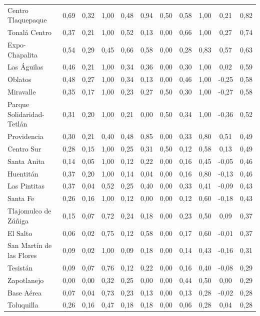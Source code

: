 \documentclass[openany]{book}
\begin{document}
\begin{table}[H]
\begin{tabular}{|l|c|c|c|c|c|c|c|c|c|c|}
			Centro Tlaquepaque & 0,69 & 0,32 & 1,00 & 0,48 & 0,94 & 0,50 & 0,58 & 1,00 & 0,21 & 0,82 \\
			Tonalá Centro & 0,37 & 0,21 & 1,00 & 0,52 & 0,13 & 0,00 & 0,66 & 1,00 & 0,27 & 0,74 \\
			Expo-Chapalita & 0,54 & 0,29 & 0,45 & 0,66 & 0,58 & 0,00 & 0,28 & 0,83 & 0,57 & 0,63 \\
			Las Águilas & 0,46 & 0,21 & 1,00 & 0,34 & 0,36 & 0,00 & 0,30 & 1,00 & 0,02 & 0,59 \\
			Oblatos & 0,48 & 0,27 & 1,00 & 0,34 & 0,13 & 0,00 & 0,46 & 1,00 & -0,25 & 0,58 \\
			Miravalle & 0,35 & 0,17 & 1,00 & 0,23 & 0,27 & 0,50 & 0,30 & 1,00 & -0,27 & 0,58 \\
			Parque Solidaridad-Tetlán & 0,31 & 0,20 & 1,00 & 0,21 & 0,00 & 0,50 & 0,34 & 1,00 & -0,36 & 0,52 \\
			Providencia & 0,30 & 0,21 & 0,40 & 0,48 & 0,85 & 0,00 & 0,33 & 0,80 & 0,51 & 0,49 \\
			Centro Sur & 0,28 & 0,15 & 1,00 & 0,25 & 0,31 & 0,50 & 0,12 & 0,58 & 0,13 & 0,49 \\
			Santa Anita & 0,14 & 0,05 & 1,00 & 0,12 & 0,22 & 0,00 & 0,16 & 0,45 & -0,05 & 0,46 \\
			Huentitán & 0,37 & 0,20 & 1,00 & 0,14 & 0,04 & 0,00 & 0,16 & 0,80 & -0,13 & 0,46 \\
			Las Pintitas & 0,37 & 0,04 & 0,52 & 0,25 & 0,40 & 0,00 & 0,33 & 0,41 & -0,09 & 0,43 \\
			Santa Fe & 0,26 & 0,16 & 1,00 & 0,12 & 0,00 & 0,00 & 0,12 & 0,60 & -0,18 & 0,43 \\
			Tlajomulco de Zúñiga & 0,15 & 0,07 & 0,72 & 0,24 & 0,18 & 0,00 & 0,23 & 0,50 & 0,09 & 0,37 \\
			El Salto & 0,06 & 0,02 & 0,75 & 0,12 & 0,58 & 0,00 & 0,17 & 0,60 & -0,01 & 0,37 \\
			San Martín de las Flores & 0,09 & 0,02 & 1,00 & 0,09 & 0,18 & 0,00 & 0,14 & 0,43 & -0,16 & 0,31 \\
			Tesistán & 0,09 & 0,07 & 0,76 & 0,12 & 0,22 & 0,00 & 0,16 & 0,40 & -0,08 & 0,29 \\
			Zapotlanejo & 0,00 & 0,00 & 0,32 & 0,25 & 0,00 & 0,00 & 0,44 & 0,50 & 0,00 & 0,29 \\
			Base Aérea & 0,07 & 0,04 & 0,73 & 0,23 & 0,13 & 0,00 & 0,13 & 0,28 & -0,02 & 0,28 \\
			Toluquilla & 0,26 & 0,16 & 0,47 & 0,18 & 0,18 & 0,00 & 0,06 & 0,28 & 0,04 & 0,28 \\

\end{tabular}
\end{table}
\end{document}
